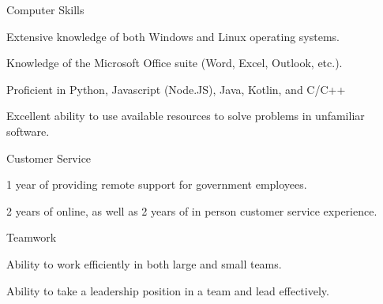 
\begin{cventries}

  \cventry
    {} %
    {Computer Skills} %
    {} %
    {} %
    {
	\begin{cvitems}
	\item {Extensive knowledge of both Windows and Linux operating systems.}
	\item {Knowledge of the Microsoft Office suite (Word, Excel, Outlook, etc.).}
	\item {Proficient in Python, Javascript (Node.JS), Java, Kotlin, and C/C++}
	\item {Excellent ability to use available resources to solve problems in unfamiliar software.}
	\end{cvitems}
    } %


  \cventry
    {} %
    {Customer Service} %
    {} %
    {} %
    {
	\begin{cvitems}
	\item {1 year of providing remote support for government employees.}
	\item {2 years of online, as well as 2 years of in person customer service experience.}
	\end{cvitems}
    } %

    \cventry
    {} %
    {Teamwork} %
    {} %
    {} %
    {
	\begin{cvitems}
	\item {Ability to work efficiently in both large and small teams.}
	\item {Ability to take a leadership position in a team and lead effectively.}
	\end{cvitems}
    } %
\end{cventries}
